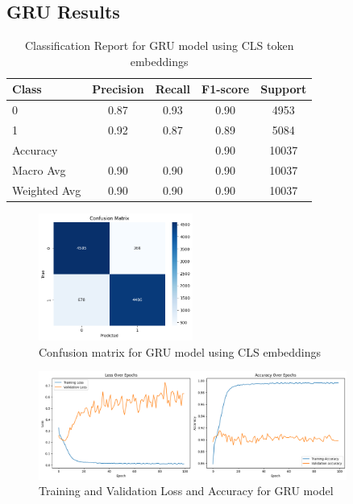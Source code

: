 \subsection{GRU Results}

\begin{table}[H]
\centering
\caption{Classification Report for GRU model using CLS token embeddings}
\label{tab:gru_classification_report}
\begin{tabular}{lcccc}
\toprule
Class        & Precision & Recall & F1-score & Support \\
\midrule
0            & 0.87      & 0.93   & 0.90     & 4953    \\
1            & 0.92      & 0.87   & 0.89     & 5084    \\
\midrule
Accuracy     &           &        & 0.90     & 10037   \\
Macro Avg    & 0.90      & 0.90   & 0.90     & 10037   \\
Weighted Avg & 0.90      & 0.90   & 0.90     & 10037   \\
\bottomrule
\end{tabular}
\end{table}

\begin{figure}[H]
    \centering
    \includegraphics[width=0.45\textwidth]{images/confusion_matrix_gru.png}
    \caption{Confusion matrix for GRU model using CLS embeddings}
    \label{fig:confusion_gru}
\end{figure}

\begin{figure}[H]
    \centering
    \includegraphics[width=0.9\textwidth]{images/loss_accuracy_gru.png}
    \caption{Training and Validation Loss and Accuracy for GRU model}
    \label{fig:training_curves_gru}
\end{figure}

